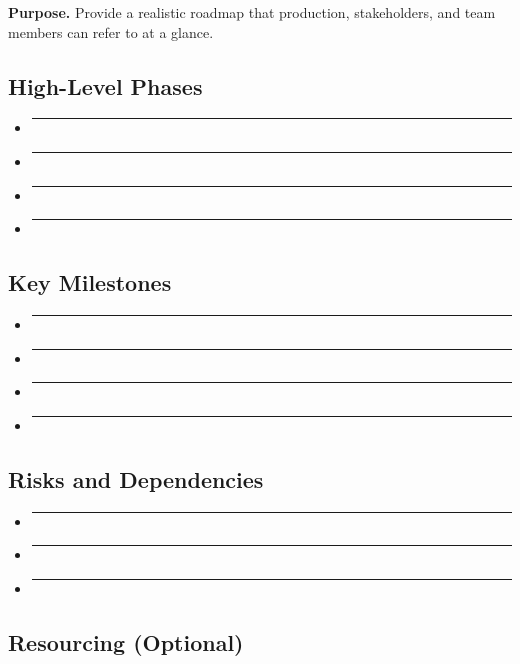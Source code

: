 \documentclass[12pt]{article}
\newcommand{\placeholder}[1]{\rule[-0.4em]{0pt}{2em}\rule{0.62\linewidth}{0.4pt}}
\begin{document}
\textbf{Purpose.} Provide a realistic roadmap that production, stakeholders, and team members can
refer to at a glance.

\subsection{High-Level Phases}

\begin{itemize}
    \item \placeholder{Pre-production (concept, prototyping, planning).}
    \item \placeholder{Production (core development, content creation).}
    \item \placeholder{Alpha / Beta (feature complete, polish, bug fixing).}
    \item \placeholder{Launch and Post-launch (release, patches, updates, live operations).}
\end{itemize}

\subsection{Key Milestones}

\begin{itemize}
    \item \placeholder{Prototype complete.}
    \item \placeholder{Vertical slice or first playable.}
    \item \placeholder{Content complete.}
    \item \placeholder{Release candidates, launch date.}
\end{itemize}

\subsection{Risks and Dependencies}

\begin{itemize}
    \item \placeholder{Technical risks (engine limitations, performance issues, platform requirements).}
    \item \placeholder{Design risks (unproven mechanics, scope creep).}
    \item \placeholder{External dependencies (publishers, vendors, certification, approvals).}
\end{itemize}

\subsection{Resourcing (Optional)}
\end{document}
